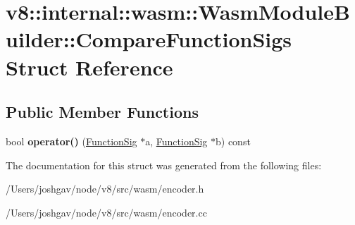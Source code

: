 \hypertarget{structv8_1_1internal_1_1wasm_1_1_wasm_module_builder_1_1_compare_function_sigs}{}\section{v8\+:\+:internal\+:\+:wasm\+:\+:Wasm\+Module\+Builder\+:\+:Compare\+Function\+Sigs Struct Reference}
\label{structv8_1_1internal_1_1wasm_1_1_wasm_module_builder_1_1_compare_function_sigs}
\subsection*{Public Member Functions}
\begin{DoxyCompactItemize}
\item 
bool {\bfseries operator()} (\hyperlink{classv8_1_1internal_1_1_signature}{Function\+Sig} $\ast$a, \hyperlink{classv8_1_1internal_1_1_signature}{Function\+Sig} $\ast$b) const \hypertarget{structv8_1_1internal_1_1wasm_1_1_wasm_module_builder_1_1_compare_function_sigs_a2d98484487d2640dd38aed5b6232295b}{}\label{structv8_1_1internal_1_1wasm_1_1_wasm_module_builder_1_1_compare_function_sigs_a2d98484487d2640dd38aed5b6232295b}

\end{DoxyCompactItemize}


The documentation for this struct was generated from the following files\+:\begin{DoxyCompactItemize}
\item 
/\+Users/joshgav/node/v8/src/wasm/encoder.\+h\item 
/\+Users/joshgav/node/v8/src/wasm/encoder.\+cc\end{DoxyCompactItemize}
